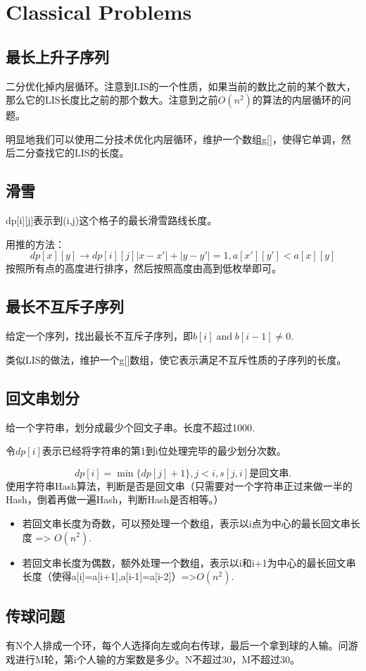 \documentclass{article}
\DeclareMathOperator{\band}{and}
\begin{document}
\section{Classical Problems}
\subsection{最长上升子序列}
二分优化掉内层循环。注意到LIS的一个性质，如果当前的数比之前的某个数大，那么它的LIS长度比之前的那个数大。注意到之前$O(n^2)$的算法的内层循环的问题。

明显地我们可以使用二分技术优化内层循环，维护一个数组g[]，使得它单调，然后二分查找它的LIS的长度。
\subsection{滑雪}

dp[i][j]表示到(i,j)这个格子的最长滑雪路线长度。

用推的方法：$$dp[x][y]\to dp[i][j]|x-x'|+|y-y'|=1,a[x'][y']<a[x][y]$$
按照所有点的高度进行排序，然后按照高度由高到低枚举即可。
\subsection{最长不互斥子序列}
给定一个序列，找出最长不互斥子序列，即$b[i]\band b[i-1]\neq 0.$

类似LIS的做法，维护一个g[]数组，使它表示满足不互斥性质的子序列的长度。
\subsection{回文串划分}
给一个字符串，划分成最少个回文子串。长度不超过1000.

令$dp[i]$表示已经将字符串的第1到i位处理完毕的最少划分次数。

$$dp[i]=\min\{dp[j]+1\},j<i,s[j,i]是回文串.$$
使用字符串Hash算法，判断是否是回文串（只需要对一个字符串正过来做一半的Hash，倒着再做一遍Hash，判断Hash是否相等。）
\begin{itemize}
    \item{若回文串长度为奇数，可以预处理一个数组，表示以i点为中心的最长回文串长度 => $O(n^2)$.}
    \item{若回文串长度为偶数，额外处理一个数组，表示以i和i+1为中心的最长回文串长度（使得a[i]=a[i+1],a[i-1]=a[i-2]）=>$O(n^2)$.}
\end{itemize}
\subsection{传球问题}
有N个人排成一个环，每个人选择向左或向右传球，最后一个拿到球的人输。问游戏进行M轮，第i个人输的方案数是多少。N不超过30，M不超过30。
\end{document}

